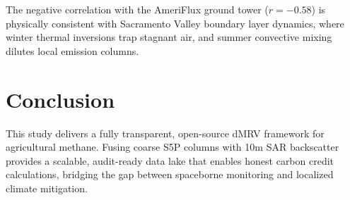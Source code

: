 \documentclass[sn-mathphys,Numbered]{sn-jnl}
\begin{document}
The negative correlation with the AmeriFlux ground tower ($r = -0.58$) is physically consistent with Sacramento Valley boundary layer dynamics, where winter thermal inversions trap stagnant air, and summer convective mixing dilutes local emission columns.

\section{Conclusion}\label{sec:conclusion}
This study delivers a fully transparent, open-source dMRV framework for agricultural methane. Fusing coarse S5P columns with 10m SAR backscatter provides a scalable, audit-ready data lake that enables honest carbon credit calculations, bridging the gap between spaceborne monitoring and localized climate mitigation.
\end{document}
